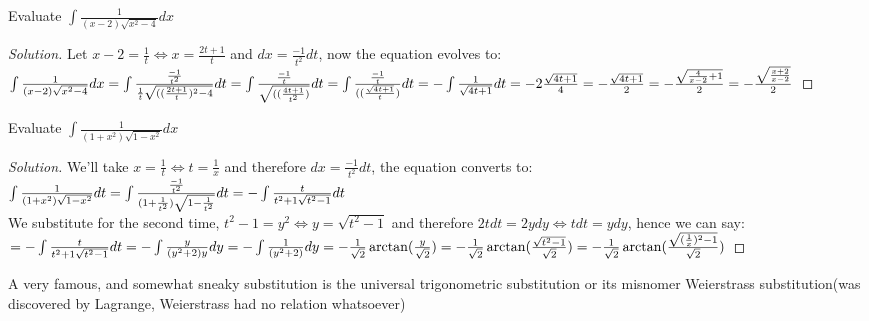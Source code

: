 \begin{example}
    Evaluate $\int \frac{1}{(x-2)\sqrt{x^2-4}}dx$
\end{example}
\begin{proof}
    [Solution]
    Let $x-2=\frac{1}{t} \iff x=\frac{2t+1}{t}$ and $dx=\frac{-1}{t^2}dt$, now the equation evolves to:\\
    $\int \frac{1}{(x-2)\sqrt{x^2-4}}dx\\
    = \int \frac{\frac{-1}{t^2}}{\frac{1}{t}\sqrt{((\frac{2t+1}{t})^2-4}}dt\\
    = \int \frac{\frac{-1}{t}}{\sqrt{((\frac{4t+1}{t^2})}}dt\\
    = \int \frac{\frac{-1}{t}}{((\frac{\sqrt{4t+1}}{t})}dt\\
    = -\int \frac{1}{\sqrt{4t+1}}dt\\
    = - 2 \frac{\sqrt{4t+1}}{4}
    = -\frac{\sqrt{4t+1}}{2}
    = -\frac{\sqrt{\frac{4}{x-2}+1}}{2}
    = -\frac{\sqrt{\frac{x+2}{x-2}}}{2}
    $
\end{proof}
\begin{example}
    Evaluate $\int \frac{1}{(1+x^2)\sqrt{1-x^2}} dx$
\end{example}
\begin{proof}
    [Solution]
    We'll take $x=\frac{1}{t} \iff t=\frac{1}{x}$ and therefore $dx=\frac{-1}{t^2}dt$, the equation converts to:\\
    $\int \frac{1}{(1+x^2)\sqrt{1-x^2}}dt\\
    = \int \frac{\frac{-1}{t^2}}{(1+\frac{1}{t^2})\sqrt{1-\frac{1}{t^2}}}dt\\
    = -\int \frac{t}{t^2+1\sqrt{t^2-1}} dt$\\
    We substitute for the second time, $t^2-1=y^2 \iff y=\sqrt{t^2-1}$ and therefore $2tdt=2ydy \iff tdt=ydy$, hence we can say:\\
    $= -\int \frac{t}{t^2+1\sqrt{t^2-1}} dt\\
    =-\int \frac{y}{(y^2+2)y} dy\\
    =-\int \frac{1}{(y^2+2)} dy\\ 
    =- \frac{1}{\sqrt{2}} \arctan(\frac{y}{\sqrt{2}})\\
    =- \frac{1}{\sqrt{2}} \arctan(\frac{\sqrt{t^2-1}}{\sqrt{2}})\\
    =- \frac{1}{\sqrt{2}} \arctan(\frac{\sqrt{(\frac{1}{x})^2-1}}{\sqrt{2}})\\
    $
\end{proof}
A very famous, and somewhat sneaky substitution is the universal trigonometric substitution or its misnomer Weierstrass substitution(was discovered by Lagrange, Weierstrass had no relation whatsoever)\\

